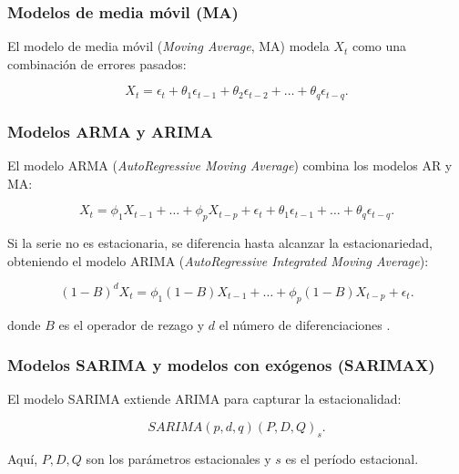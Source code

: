 \begin{itemize}
		\subsubsection{Modelos de media móvil (MA)}
		
		El modelo de media móvil (\textit{Moving Average}, MA) modela \( X_t \) como una combinación de errores pasados:
		
		\begin{equation}
			X_t = \epsilon_t + \theta_1 \epsilon_{t-1} + \theta_2 \epsilon_{t-2} + \dots + \theta_q \epsilon_{t-q}.
		\end{equation}
		
		\subsubsection{Modelos ARMA y ARIMA}
		
		El modelo ARMA (\textit{AutoRegressive Moving Average}) combina los modelos AR y MA:
		
		\begin{equation}
			X_t = \phi_1 X_{t-1} + \dots + \phi_p X_{t-p} + \epsilon_t + \theta_1 \epsilon_{t-1} + \dots + \theta_q \epsilon_{t-q}.
		\end{equation}
		
		Si la serie no es estacionaria, se diferencia hasta alcanzar la estacionariedad, obteniendo el modelo ARIMA (\textit{AutoRegressive Integrated Moving Average}):
		
		\begin{equation}
			(1 - B)^d X_t = \phi_1 (1 - B) X_{t-1} + \dots + \phi_p (1 - B) X_{t-p} + \epsilon_t.
		\end{equation}
		
		donde \( B \) es el operador de rezago y \( d \) el número de diferenciaciones \cite{box2015time}.
		
		\subsubsection{Modelos SARIMA y modelos con exógenos (SARIMAX)}
		
		El modelo SARIMA extiende ARIMA para capturar la estacionalidad:
		
		\begin{equation}
			SARIMA(p, d, q)(P, D, Q)_s.
		\end{equation}
		
		Aquí, \( P, D, Q \) son los parámetros estacionales y \( s \) es el período estacional.
		

\end{itemize}
